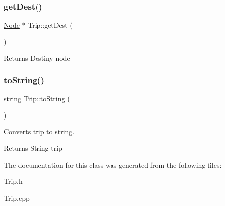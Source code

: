 \subsubsection{\texorpdfstring{get\+Dest()}{getDest()}}
{\footnotesize\ttfamily \mbox{\hyperlink{class_node}{Node}} $\ast$ Trip\+::get\+Dest (\begin{DoxyParamCaption}{ }\end{DoxyParamCaption})}

\begin{DoxyReturn}{Returns}
Destiny node 
\end{DoxyReturn}
\mbox{\label{class_trip_a8394f34452552c84d48c755279a65662}} 
\subsubsection{\texorpdfstring{to\+String()}{toString()}}
{\footnotesize\ttfamily string Trip\+::to\+String (\begin{DoxyParamCaption}{ }\end{DoxyParamCaption})}



Converts trip to string. 

\begin{DoxyReturn}{Returns}
String trip 
\end{DoxyReturn}


The documentation for this class was generated from the following files\+:\begin{DoxyCompactItemize}
\item 
Trip.\+h\item 
Trip.\+cpp\end{DoxyCompactItemize}
